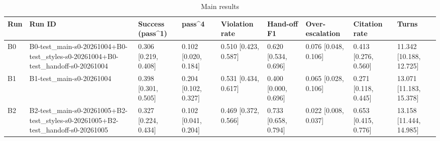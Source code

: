 \begin{table}[t]
\centering
\caption{Main results}
\begin{tabular}{lllllllll}
\hline
Run & Run ID & Success (pass\^{}1) & pass\^{}4 & Violation rate & Hand-off F1 & Over-escalation & Citation rate & Turns \\
\hline
B0 & B0-test\_main-s0-20261004+B0-test\_styles-s0-20261004+B0-test\_handoff-s0-20261004 & 0.306 [0.219, 0.408] & 0.102 [0.020, 0.184] & 0.510 [0.423, 0.587] & 0.620 [0.534, 0.696] & 0.076 [0.048, 0.106] & 0.413 [0.276, 0.560] & 11.342 [10.188, 12.725] \\
B1 & B1-test\_main-s0-20261004 & 0.398 [0.301, 0.505] & 0.204 [0.102, 0.327] & 0.531 [0.434, 0.617] & 0.400 [0.000, 0.696] & 0.065 [0.028, 0.106] & 0.271 [0.118, 0.445] & 13.071 [11.183, 15.378] \\
B2 & B2-test\_main-s0-20261005+B2-test\_styles-s0-20261005+B2-test\_handoff-s0-20261005 & 0.327 [0.224, 0.434] & 0.102 [0.041, 0.204] & 0.469 [0.372, 0.566] & 0.733 [0.658, 0.794] & 0.022 [0.008, 0.037] & 0.653 [0.415, 0.776] & 13.158 [11.444, 14.985] \\
\hline
\end{tabular}
\end{table}
